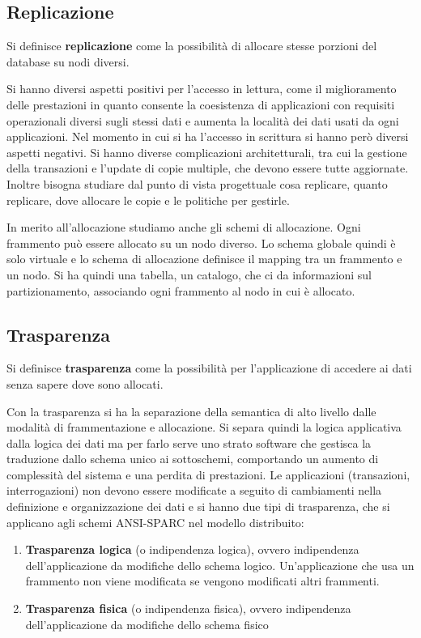 \subsection{Replicazione}
\begin{definizione}
      Si definisce \textbf{replicazione} come la possibilità di allocare stesse
      porzioni del database su nodi diversi.
\end{definizione}
Si hanno diversi aspetti positivi per l'accesso in lettura, come il miglioramento
delle prestazioni in quanto consente la coesistenza di applicazioni con requisiti
operazionali diversi sugli stessi dati e aumenta la località dei dati usati da
ogni applicazioni. Nel momento in cui si ha l'accesso in scrittura si hanno però
diversi aspetti negativi. Si hanno diverse complicazioni architetturali, tra cui
la gestione della transazioni e l'update di copie multiple, che devono essere
tutte aggiornate. Inoltre bisogna studiare dal punto di vista progettuale cosa
replicare, quanto replicare, dove allocare le copie e le politiche per gestirle.

In merito all'allocazione studiamo anche gli schemi di allocazione. Ogni
frammento può essere allocato su un nodo diverso. Lo schema globale quindi
è solo virtuale e lo schema di allocazione definisce il mapping tra un frammento
e un nodo. Si ha quindi una tabella, un catalogo, che ci da informazioni sul
partizionamento, associando ogni frammento al nodo in cui è allocato.
\subsection{Trasparenza}
\begin{definizione}
      Si definisce \textbf{trasparenza} come la possibilità per l'applicazione di
      accedere ai dati senza sapere dove sono allocati.
\end{definizione}
Con la trasparenza si ha la separazione della semantica di alto livello dalle
modalità di frammentazione e allocazione. Si separa quindi la logica applicativa
dalla logica dei dati ma per farlo serve uno strato software che gestisca la
traduzione dallo schema unico ai sottoschemi, comportando un aumento di
complessità del sistema e una perdita di prestazioni.
Le applicazioni (transazioni, interrogazioni) non devono essere modificate a
seguito di cambiamenti nella definizione e organizzazione dei dati e si hanno
due tipi di trasparenza, che si applicano agli schemi ANSI-SPARC nel
modello distribuito:
\begin{enumerate}
      \item \textbf{Trasparenza logica} (o indipendenza logica), ovvero
            indipendenza dell'applicazione da modifiche dello schema logico.
            Un'applicazione che usa un frammento non viene modificata se vengono
            modificati altri frammenti.
      \item \textbf{Trasparenza fisica} (o indipendenza fisica), ovvero
            indipendenza dell'applicazione da modifiche dello schema fisico
\end{enumerate}

